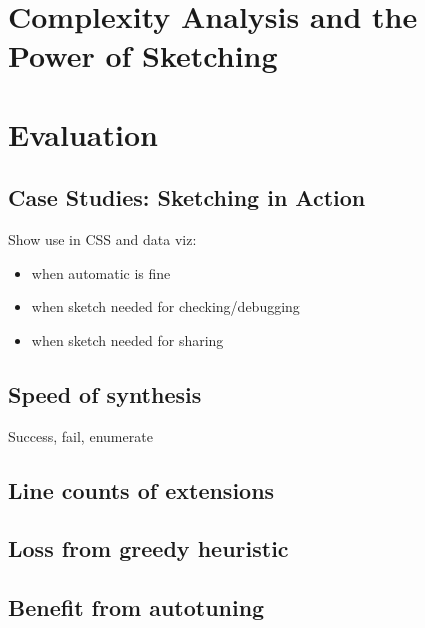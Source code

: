 \section{Complexity Analysis and the Power of Sketching}
\section{Evaluation}
\subsection{Case Studies: Sketching in Action}
Show use in CSS and data viz: 
\begin{itemize}
\item when automatic is fine
\item when sketch needed for checking/debugging
\item when sketch needed for sharing
\end{itemize}
\subsection{Speed of synthesis}
Success, fail, enumerate
\subsection{Line counts of extensions}
\subsection{Loss from greedy heuristic}
\subsection{Benefit from autotuning}


